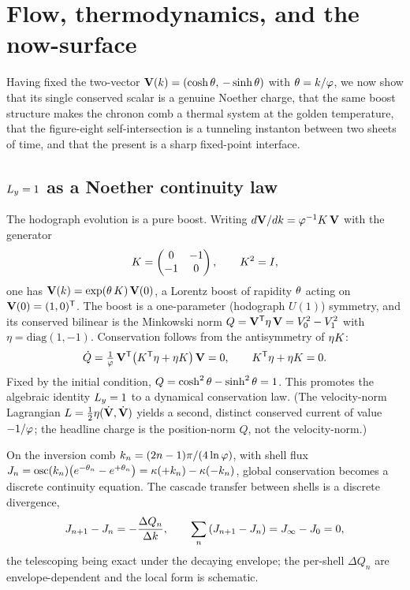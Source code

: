 \section{Flow, thermodynamics, and the now-surface}\label{sec:thermo}

Having fixed the two-vector $\mathbf{V}(k)=(\cosh\theta,\,-\sinh\theta)$ with $\theta=k/\varphi$, we now show that its single conserved scalar is a genuine Noether charge, that the same boost structure makes the chronon comb a thermal system at the golden temperature, that the figure-eight self-intersection is a tunneling instanton between two sheets of time, and that the present is a sharp fixed-point interface.

\subsection{$L_{y}=1$ as a Noether continuity law}

The hodograph evolution is a pure boost. Writing $d\mathbf{V}/dk=\varphi^{-1}K\,\mathbf{V}$ with the generator
\begin{equation}
K=\begin{pmatrix}0&-1\\-1&0\end{pmatrix},\qquad K^2=I,
\label{eq:thermo:Kgen}
\end{equation}
one has $\mathbf{V}(k)=\exp(\theta\,K)\,\mathbf{V}(0)$, a Lorentz boost of rapidity $\theta$ acting on $\mathbf{V}(0)=(1,0)^{\mathsf T}$. The boost is a one-parameter (hodograph $U(1)$) symmetry, and its conserved bilinear is the Minkowski norm $Q=\mathbf{V}^{\mathsf T}\eta\,\mathbf{V}=V_0^2-V_1^2$ with $\eta=\mathrm{diag}(1,-1)$. Conservation follows from the antisymmetry of $\eta K$:
\begin{equation}
\dot Q=\tfrac{1}{\varphi}\,\mathbf{V}^{\mathsf T}\!\left(K^{\mathsf T}\eta+\eta K\right)\mathbf{V}=0,
\qquad K^{\mathsf T}\eta+\eta K=0 .
\label{eq:thermo:Qdot}
\end{equation}
Fixed by the initial condition, $Q=\cosh^2\theta-\sinh^2\theta=1$. This promotes the algebraic identity $L_{y}=1$ to a dynamical conservation law. (The velocity-norm Lagrangian $L=\tfrac12\eta(\dot{\mathbf{V}},\dot{\mathbf{V}})$ yields a second, distinct conserved current of value $-1/\varphi$; the headline charge is the position-norm $Q$, not the velocity-norm.)

On the inversion comb $k_n=(2n-1)\pi/(4\ln\varphi)$, with shell flux $J_n=\operatorname{osc}(k_n)\!\left(e^{-\theta_n}-e^{+\theta_n}\right)=\kappa(+k_n)-\kappa(-k_n)$, global conservation becomes a discrete continuity equation. The cascade transfer between shells is a discrete divergence,
\begin{equation}
J_{n+1}-J_n=-\frac{\Delta Q_n}{\Delta k},\qquad \sum_n\left(J_{n+1}-J_n\right)=J_\infty-J_0=0 ,
\label{eq:thermo:cont}
\end{equation}
the telescoping being exact under the decaying envelope; the per-shell $\Delta Q_n$ are envelope-dependent and the local form is schematic.

